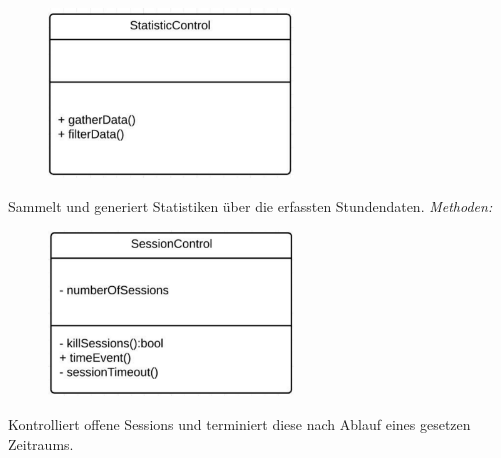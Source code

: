 \begin{itemize}
\begin{itemize}
                    \newpage
                    \begin{figure}[htb]
                    \centering
                    \includegraphics[width=6.5cm]{Diagramms/class/singleclass/ControlStat.pdf}
                    \end{figure}
                    \newline
                        Sammelt und generiert Statistiken über die erfassten Stundendaten.
                                                           \newline
                    \emph{Methoden:}
                        \begin{itemize}
                        \end{itemize}

                
                    \begin{figure}[htb]
                    \centering
                    \includegraphics[width=6.5cm]{Diagramms/class/singleclass/ControlSession.pdf}
                    \end{figure}
                    \newline
                        Kontrolliert offene Sessions und terminiert diese nach Ablauf eines gesetzen Zeitraums.
                        \begin{itemize}
                        \end{itemize}
                \end{itemize}

            \begin{itemize}
                 \itm{}
            \end{itemize}

        \end{itemize}

